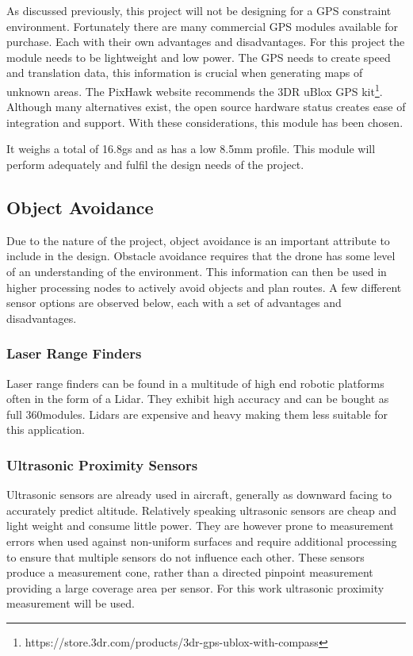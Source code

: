 		As discussed previously, this project will not be designing for a GPS constraint environment. Fortunately there are many commercial  GPS modules available for purchase. Each with their own advantages and disadvantages. For this project the module needs to be lightweight and low power. The GPS needs to create speed and translation data, this information is crucial when generating maps of unknown areas. The PixHawk website recommends the 3DR uBlox GPS kit\footnote{https://store.3dr.com/products/3dr-gps-ublox-with-compass}. Although many alternatives exist, the open source hardware status creates ease of integration and support. With these considerations, this module has been chosen.
		
		It weighs a total of 16.8gs and as has a low 8.5mm profile. This module will perform adequately and fulfil the design needs of the project.
	
		\subsection{Object Avoidance}\label{SECT_ObjectAvoidance}
		Due to the nature of the project, object avoidance is an important attribute to include in the design. Obstacle avoidance requires that the drone has some level of an understanding of the environment. This information can then be used in higher processing nodes to actively avoid objects and plan routes. A few different sensor options are observed below, each with a set of advantages and disadvantages. 
		
			\subsubsection{Laser Range Finders}
			Laser range finders can be found in a multitude of high end robotic platforms often in the form of a Lidar. They exhibit high accuracy and can be bought as full $360$\textdegree modules. Lidars are expensive and heavy making them less suitable for this application.
			
			\subsubsection{Ultrasonic Proximity Sensors}
			Ultrasonic sensors are already used in aircraft, generally as downward facing to accurately predict altitude. Relatively speaking ultrasonic sensors are cheap and light weight and consume little power. They are however prone to measurement errors when used against non-uniform surfaces and require additional processing to ensure that multiple sensors do not influence each other. These sensors produce a measurement cone, rather than a directed pinpoint measurement providing a large coverage area per sensor. For this work ultrasonic proximity measurement will be used.
			
			
			
	